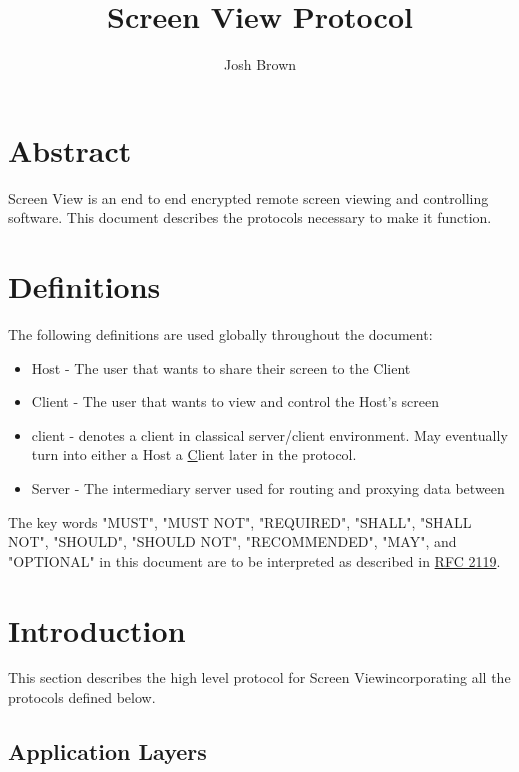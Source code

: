 \documentclass{article}
\title{Screen View Protocol}
\author{Josh Brown}
\newcommand{\projectName}{Screen View}
\begin{document}
    \maketitle
    \newpage


    \section{Abstract}
    \projectName{} is an end to end encrypted remote screen viewing and controlling software. This document describes
    the protocols necessary to make it function.
    \newpage


    \tableofcontents
    \newpage


    \section{Definitions}
    The following definitions are used globally throughout the document:

    \begin{itemize}
        \item Host - The user that wants to share their screen to the Client
        \item Client - The user that wants to view and control the Host's screen
        \item client - denotes a client in classical server/client environment. May eventually turn into either a Host a \underline{C}lient later in the protocol.
        \item Server - The intermediary server used for routing and proxying data between
    \end{itemize}


    The key words "MUST", "MUST NOT", "REQUIRED", "SHALL", "SHALL NOT",
    "SHOULD", "SHOULD NOT", "RECOMMENDED", "MAY", and "OPTIONAL" in this
    document are to be interpreted as described in \href{https://datatracker.ietf.org/doc/html/rfc2119}{RFC 2119}.

    \newpage


    \section{Introduction}

    This section describes the high level protocol for \projectName incorporating all the protocols defined below.\\

    \subsection{Application Layers}
\end{document}
